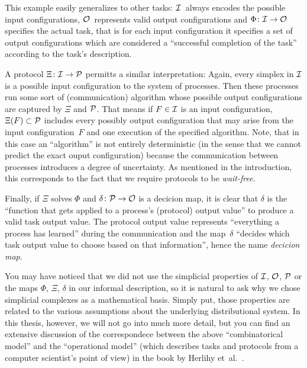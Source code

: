 This example easily generalizes to other tasks:
$\mathcal{I}$~always encodes the possible input configurations,
$\mathcal{O}$~represents valid output configurations and
$\Phi\colon\mathcal{I}\to\mathcal{O}$ specifies the actual task, that is
for each input configuration it specifies a set of output
configurations which are considered a \enquote{successful
completion of the task} according to the task's description.

A protocol $\Xi\colon\mathcal{I}\to\mathcal{P}$ permitts a similar interpretation:
Again, every simplex in $\mathcal{I}$ is a possible input configuration to
the system of processes. Then these processes run some sort of
(communication) algorithm whose possible output configurations are
captured by $\Xi$ and $\mathcal{P}$. That means if $F\in\mathcal{I}$ is an input
configuration, $\Xi(F) \subset \mathcal{P}$ includes every possibly output
configuration that may arise from the input configuration~$F$ and
one execution of the specified algorithm. Note, that in this case
an \enquote{algorithm} is not entirely deterministic (in the sense
that we cannot predict the exact ouput configuration) because the
communication between processes introduces a degree of uncertainty.
As mentioned %
in the introduction, this corresponds to the fact that we require
protocols to be \emph{wait-free}.

Finally, if $\Xi$ solves $\Phi$ and $\delta\colon\mathcal{P}\to\mathcal{O}$ is a decicion
map, it is clear that $\delta$ is the \enquote{function that gets applied
to a process's (protocol) output value} to produce a valid task
output value. The protocol output value represents \enquote{everything
a process has learned} during the communication and the map~$\delta$
\enquote{decides which task output value to choose based on that
information}, hence the name \emph{decicion map}.

You may have noticed that we did not use the simplicial properties of
$\mathcal{I}$, $\mathcal{O}$, $\mathcal{P}$ or the maps $\Phi$, $\Xi$, $\delta$ in our
informal description, so it is natural to ask why we chose simplicial
complexes as a mathematical basis. Simply put, those properties are
related to the various assumptions about the underlying distributional
system. In this thesis, however, we will not go into much more detail,
but you can find an extensive discussion of the correspondece between
the above \enquote{combinatorical model} and the \enquote{operational
model} (which describes tasks and protocols from a computer
scientist's point of view) in the book by
Herlihy et~al.~\cite[Ch.\,4]{bookc:herlihyetal13}.
